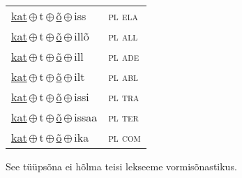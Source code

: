 \begin{minipage}{\textwidth}
\begin{sideways}
\begin{tabular}{l l}
\underline{kat}\,$\oplus$\,t\,$\oplus$\,\underline{õ}\,$\oplus$\,iss & \textsc{ pl ela } \\
\underline{kat}\,$\oplus$\,t\,$\oplus$\,\underline{õ}\,$\oplus$\,illõ & \textsc{ pl all } \\
\underline{kat}\,$\oplus$\,t\,$\oplus$\,\underline{õ}\,$\oplus$\,ill & \textsc{ pl ade } \\
\underline{kat}\,$\oplus$\,t\,$\oplus$\,\underline{õ}\,$\oplus$\,ilt & \textsc{ pl abl } \\
\underline{kat}\,$\oplus$\,t\,$\oplus$\,\underline{õ}\,$\oplus$\,issi & \textsc{ pl tra } \\
\underline{kat}\,$\oplus$\,t\,$\oplus$\,\underline{õ}\,$\oplus$\,issaa & \textsc{ pl ter } \\
\underline{kat}\,$\oplus$\,t\,$\oplus$\,\underline{õ}\,$\oplus$\,ika & \textsc{ pl com } \\
\end{tabular}
\end{sideways}
\label{tab:tüüpsõnamall-katõ}

\end{minipage}

 
\vspace{1em}
\noindent See tüüpsõna ei hõlma teisi lekseeme vormi\-sõnastikus.
